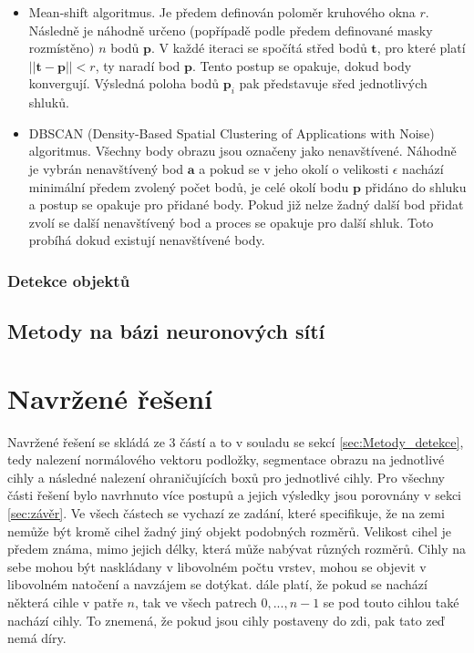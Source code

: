 \documentclass[twoside]{ctuthesis}
\newcommand{\tl}[1]{$\mathbf{#1}$}
\begin{document}
\begin{itemize}
\begin{itemize}
        \item Mean-shift algoritmus. Je předem definován poloměr kruhového okna $r$. Následně je náhodně určeno (popřípadě podle předem definované masky rozmístěno) $n$ bodů \tl{p}. V každé iteraci se spočítá střed bodů $\mathbf{t}$, pro které platí $||\mathbf{t} - \mathbf{p}|| < r$, ty naradí bod \tl{p}. Tento postup se opakuje, dokud body konvergují. Výsledná poloha bodů $\mathbf{p}_i$ pak představuje sřed jednotlivých shluků. 
        \item DBSCAN (Density-Based Spatial Clustering of Applications with Noise) algoritmus. Všechny body obrazu jsou označeny jako nenavštívené. Náhodně je vybrán nenavštívený bod \tl{a} a pokud se v jeho okolí o velikosti $\epsilon$ nachází minimální předem zvolený počet bodů, je celé okolí bodu \tl{p} přidáno do shluku a postup se opakuje pro přidané body. Pokud již nelze žadný další bod přidat zvolí se další nenavštívený bod a proces se opakuje pro další shluk. Toto probíhá dokud existují nenavštívené body. 
    \end{itemize}
\end{itemize}

\subsubsection{Detekce objektů}

\subsection{Metody na bázi neuronových sítí}


\section{Navržené řešení}

Navržené řešení se skládá ze 3 částí a to v souladu se sekcí \ref{sec:Metody_detekce}, tedy nalezení normálového vektoru podložky, segmentace obrazu na jednotlivé cihly a následné nalezení ohraničujících boxů pro jednotlivé cihly. Pro všechny části řešení bylo navrhnuto více postupů a jejich výsledky jsou porovnány v sekci \ref{sec:závěr}. Ve všech částech se vychazí ze zadání, které specifikuje, že na zemi nemůže být kromě cihel žadný jiný objekt podobných rozměrů. Velikost cihel je předem známa, mimo jejich délky, která může nabývat různých rozměrů. Cihly na sebe mohou být naskládany v libovolném počtu vrstev, mohou se objevit v libovolném natočení a navzájem se dotýkat. dále platí, že pokud se nachází některá cihle v patře $n$, tak ve všech patrech $0,...,n-1$ se pod touto cihlou také nachází cihly. To znemená, že pokud jsou cihly postaveny do zdi, pak tato zeď nemá díry.
\end{document}
